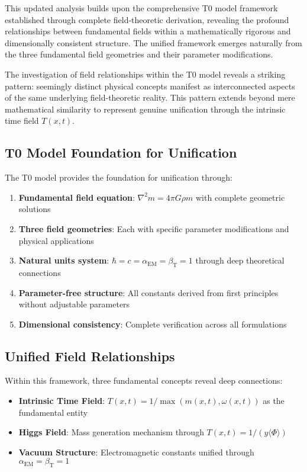 \documentclass[12pt,a4paper]{article}
\newcommand{\Tfieldt}{T(x,t)}
\begin{document}
	This updated analysis builds upon the comprehensive T0 model framework established through complete field-theoretic derivation, revealing the profound relationships between fundamental fields within a mathematically rigorous and dimensionally consistent structure. The unified framework emerges naturally from the three fundamental field geometries and their parameter modifications.
	
	The investigation of field relationships within the T0 model reveals a striking pattern: seemingly distinct physical concepts manifest as interconnected aspects of the same underlying field-theoretic reality. This pattern extends beyond mere mathematical similarity to represent genuine unification through the intrinsic time field $\Tfieldt$.
	
	\subsection{T0 Model Foundation for Unification}
	\label{subsec:t0_foundation}
	
	The T0 model provides the foundation for unification through:
	
	\begin{enumerate}
		\item \textbf{Fundamental field equation}: $\nabla^2 m = 4\pi G \rho m$ with complete geometric solutions
		\item \textbf{Three field geometries}: Each with specific parameter modifications and physical applications
		\item \textbf{Natural units system}: $\hbar = c = \alpha_{\text{EM}} = \beta_{\text{T}} = 1$ through deep theoretical connections
		\item \textbf{Parameter-free structure}: All constants derived from first principles without adjustable parameters
		\item \textbf{Dimensional consistency}: Complete verification across all formulations
	\end{enumerate}
	
	\subsection{Unified Field Relationships}
	\label{subsec:unified_relationships}
	
	Within this framework, three fundamental concepts reveal deep connections:
	
	\begin{tcolorbox}[colback=blue!5!white,colframe=blue!75!black,title=T0 Unified Framework Components]
		\begin{itemize}
			\item \textbf{Intrinsic Time Field}: $\Tfieldt = 1/\max(m(x,t), \omega(x,t))$ as the fundamental entity
			\item \textbf{Higgs Field}: Mass generation mechanism through $\Tfieldt = 1/(y\langle\Phi\rangle)$
			\item \textbf{Vacuum Structure}: Electromagnetic constants unified through $\alpha_{\text{EM}} = \beta_{\text{T}} = 1$
		\end{itemize}
	\end{tcolorbox}
	
\end{document}
